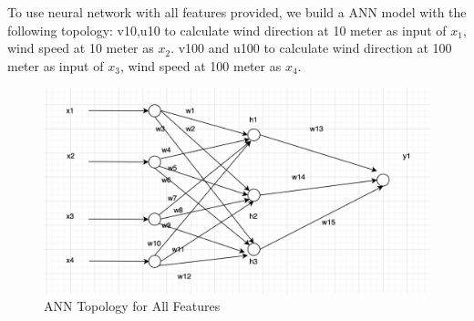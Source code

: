 \documentclass[a4paper, article, oneside, USenglish, IN5460]{memoir}
\begin{document}
{\color{blue}To use neural network with all features provided, we build a ANN model with the following topology: v10,u10 to calculate wind direction at 10 meter as input of $x_1$, wind speed at 10 meter as $x_2$. v100 and u100 to calculate wind direction at 100 meter as input of $x_3$,  wind speed at 100 meter as $x_4$.  
\color{red}{write program of this model , and a paragraph to explan the predicted values vs. actual measurements }
\begin{figure}
\centering
\includegraphics[width=0.8\linewidth]{fig/q41.png}
\caption{\label{fig:q41} \neutral ANN Topology for All Features}
\end{figure}

}


\end{document}
